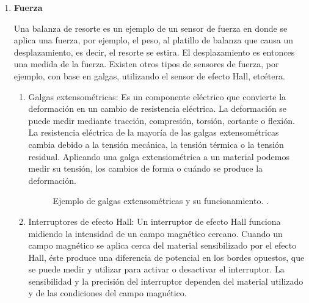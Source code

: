 \begin{enumerate}
			\item \textbf{Fuerza}
			
			Una balanza de resorte es un ejemplo de un sensor de fuerza en donde se aplica una fuerza, por ejemplo, el peso, al platillo de balanza que causa un desplazamiento, es decir, el resorte se estira. El desplazamiento es entonces una medida de la fuerza. Existen otros tipos de sensores de fuerza, por ejemplo, con base en galgas, utilizando el sensor de efecto Hall, etcétera. \cite{saha2010robotics}\\
			\begin{enumerate}
				\item Galgas extensométricas: Es un componente eléctrico que convierte la deformación en un cambio de resistencia eléctrica. La deformación se puede medir mediante tracción, compresión, torsión, cortante o flexión. La resistencia eléctrica de la mayoría de las galgas extensométricas cambia debido a la tensión mecánica, la tensión térmica o la tensión residual. Aplicando una galga extensiométrica a un material podemos medir su tensión, los cambios de forma o cuándo se produce la deformación. \cite{Galgas} \\
				
				\begin{figure}[h]
					\centering
					\hspace{0.5cm} %
					\caption{Ejemplo de galgas extensométricas y su funcionamiento. \cite{GalgasImagen}.}
					\label{fig:GalgasGeneral}
					
				\end{figure}
	
				\item Interruptores de efecto Hall: Un interruptor de efecto Hall funciona midiendo la intensidad de un campo magnético cercano. Cuando un campo magnético se aplica cerca del material sensibilizado por el efecto Hall, éste produce una diferencia de potencial en los bordes opuestos, que se puede medir y utilizar para activar o desactivar el interruptor. La sensibilidad y la precisión del interruptor dependen del material utilizado y de las condiciones del campo magnético.\cite{Efecto_Hall}\\
				

\end{enumerate}
\end{enumerate}
